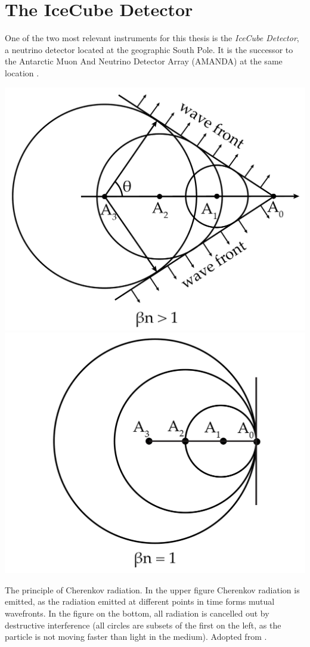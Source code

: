 \documentclass[
    a4paper, %
    fontsize=10pt, %
    twoside=true, %
    numbers=noenddot, %
    fontmethod=tex, %
]{kaobook}
\begin{document}
\chapter{The IceCube Detector}
One of the two most relevant instruments for this thesis is the \textit{IceCube Detector}, a neutrino detector located at the geographic South Pole. It is the successor to the Antarctic Muon And Neutrino Detector Array (AMANDA) at the same location . 
\begin{marginfigure}
    \includegraphics{ic_cherenkov1.pdf}
    \includegraphics{ic_cherenkov2.pdf}
    \caption[Cherenkov radiation]{The principle of Cherenkov radiation. In the upper figure Cherenkov radiation is emitted, as the radiation emitted at different points in time forms mutual wavefronts. In the figure on the bottom, all radiation is cancelled out by destructive interference (all circles are subsets of the first on the left, as the particle is not moving faster than light in the medium). Adopted from \cite{LAnnunziata2020}.}
\end{marginfigure}
\end{document}
